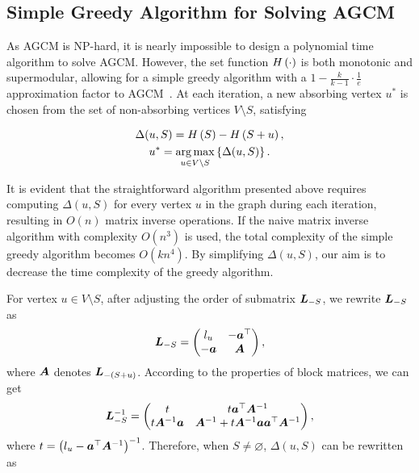\documentclass[10pt,twocolumn,twoside]{IEEEtran}
\begin{document}
\subsection{Simple Greedy Algorithm for Solving AGCM}

As AGCM is NP-hard, it is nearly impossible to design a polynomial time algorithm to solve AGCM.
However, the set function \(H\left(\cdot\right)\) is both monotonic and supermodular, allowing for a simple greedy algorithm with a \(1-\frac{k}{k-1}\cdot\frac{1}{e}\) approximation factor to AGCM~\cite{NeWoFi78}.
At each iteration, a new absorbing vertex \(u^*\) is chosen from the set of non-absorbing vertices \(V\setminus S\), satisfying

\begin{gather*}
    \Delta(u,S)=H\left(S\right)-H\left(S+u\right),\\
    u^*=\operatorname*{arg\,max}_{u\in V\setminus S}\left\{\Delta(u,S) \right\}.
\end{gather*}

It is evident that the straightforward algorithm presented above requires computing \(\Delta(u,S)\) for every vertex \(u\) in the graph during each iteration, resulting in \(O(n)\) matrix inverse operations.
If the naive matrix inverse algorithm with complexity \(O(n^3)\) is used, the total complexity of the simple greedy algorithm becomes \(O(kn^4)\).
By simplifying \(\Delta(u,S)\), our aim is to decrease the time complexity of the greedy algorithm.

For vertex \(u\in V\setminus S\), after adjusting the order of submatrix \(\boldsymbol{L}_{-S}\), we rewrite \(\boldsymbol{L}_{-S}\) as
\begin{equation*}
    \boldsymbol{L}_{-S}=\begin{pmatrix}l_u & -\boldsymbol{a}^\top \\-\boldsymbol{a}&\boldsymbol{A}\end{pmatrix},
\end{equation*}
where \(\boldsymbol{A}\) denotes \(\boldsymbol{L}_{-(S+u)}\).
According to the properties of block matrices, we can get
\begin{equation*}
    \boldsymbol{L}_{-S}^{-1}=
    \begin{pmatrix}
        t & t\boldsymbol{a}^\top\boldsymbol{A}^{-1} \\t\boldsymbol{A}^{-1}\boldsymbol{a}&\boldsymbol{A}^{-1}+t\boldsymbol{A}^{-1}\boldsymbol{a}\boldsymbol{a}^\top\boldsymbol{A}^{-1}
    \end{pmatrix},
\end{equation*}
where \(t={\left( l_u-\boldsymbol{a}^\top{\boldsymbol{A}}^{-1} \right)}^{-1}\).
Therefore, when \(S\neq\varnothing\), \(\Delta(u,S)\) can be rewritten as
\end{document}
